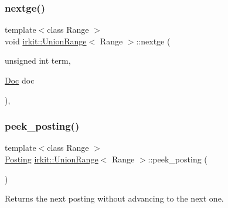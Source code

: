 \mbox{\label{classirkit_1_1UnionRange_ab0548ed7d94aece8f72d0ca4db65b456}} 
\subsubsection{\texorpdfstring{nextge()}{nextge()}}
{\footnotesize\ttfamily template$<$class Range $>$ \\
void \hyperlink{classirkit_1_1UnionRange}{irkit\+::\+Union\+Range}$<$ Range $>$\+::nextge (\begin{DoxyParamCaption}\item[{unsigned int}]{term,  }\item[{\hyperlink{classirkit_1_1UnionRange_a387589b1f09868b60485c4ab8c61f97a}{Doc}}]{doc }\end{DoxyParamCaption})\hspace{0.3cm}{\ttfamily [inline]}, {\ttfamily [protected]}}

\mbox{\label{classirkit_1_1UnionRange_a5c2f9a6ec77c812febdf1778e4b9b3f6}} 
\subsubsection{\texorpdfstring{peek\+\_\+posting()}{peek\_posting()}}
{\footnotesize\ttfamily template$<$class Range $>$ \\
\hyperlink{classirkit_1_1UnionRange_a5f694970419f5a60d7fd41d740556229}{Posting} \hyperlink{classirkit_1_1UnionRange}{irkit\+::\+Union\+Range}$<$ Range $>$\+::peek\+\_\+posting (\begin{DoxyParamCaption}{ }\end{DoxyParamCaption})\hspace{0.3cm}{\ttfamily [inline]}}



Returns the next posting without advancing to the next one. 

\mbox{\label{classirkit_1_1UnionRange_aa985f4985486d3df259be0c932340f18}} 
